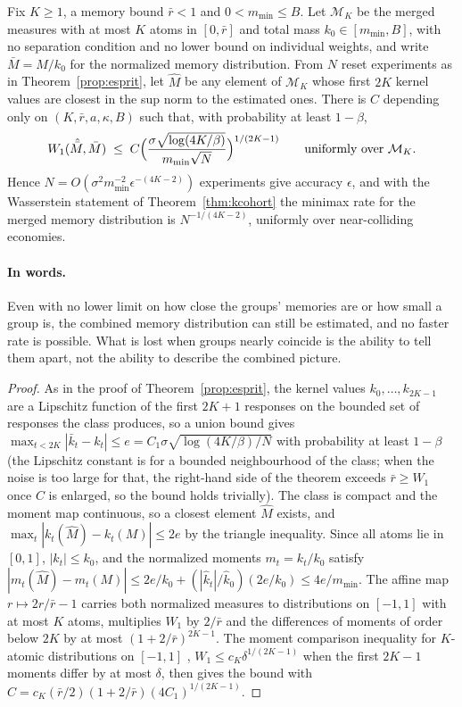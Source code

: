 \begin{theorem}\label{thm:uniformw1}
Fix $K\ge1$, a memory bound $\bar r<1$ and $0<m_{\min}\le B$. Let $\mathcal M_K$ be the merged measures with at most $K$ atoms in $[0,\bar r]$ and total mass $k_0\in[m_{\min},B]$, with no separation condition and no lower bound on individual weights, and write $\bar M=M/k_0$ for the normalized memory distribution. From $N$ reset experiments as in Theorem~\ref{prop:esprit}, let $\hat M$ be any element of $\mathcal M_K$ whose first $2K$ kernel values are closest in the sup norm to the estimated ones. There is $C$ depending only on $(K,\bar r,a,\kappa,B)$ such that, with probability at least $1-\beta$,
\[
W_1(\hat{\bar M},\bar M)\;\le\;C\Bigl(\frac{\sigma\sqrt{\log(4K/\beta)}}{m_{\min}\sqrt N}\Bigr)^{1/(2K-1)}\qquad\text{uniformly over }\mathcal M_K .
\]
Hence $N=O(\sigma^2m_{\min}^{-2}\epsilon^{-(4K-2)})$ experiments give accuracy $\epsilon$, and with the Wasserstein statement of Theorem~\ref{thm:kcohort} the minimax rate for the merged memory distribution is $N^{-1/(4K-2)}$, uniformly over near-colliding economies.
\end{theorem}

\paragraph{In words.} Even with no lower limit on how close the groups' memories are or how small a group is, the combined memory distribution can still be estimated, and no faster rate is possible. What is lost when groups nearly coincide is the ability to tell them apart, not the ability to describe the combined picture.

\begin{proof}
As in the proof of Theorem~\ref{prop:esprit}, the kernel values $k_0,\ldots,k_{2K-1}$ are a Lipschitz function of the first $2K+1$ responses on the bounded set of responses the class produces, so a union bound gives $\max_{t<2K}|\bar k_t-k_t|\le e=C_1\sigma\sqrt{\log(4K/\beta)/N}$ with probability at least $1-\beta$ (the Lipschitz constant is for a bounded neighbourhood of the class; when the noise is too large for that, the right-hand side of the theorem exceeds $\bar r\ge W_1$ once $C$ is enlarged, so the bound holds trivially). The class is compact and the moment map continuous, so a closest element $\hat M$ exists, and $\max_t|k_t(\hat M)-k_t(M)|\le2e$ by the triangle inequality. Since all atoms lie in $[0,1]$, $|k_t|\le k_0$, and the normalized moments $m_t=k_t/k_0$ satisfy $|m_t(\hat M)-m_t(M)|\le2e/k_0+(|\hat k_t|/\hat k_0)(2e/k_0)\le4e/m_{\min}$. The affine map $r\mapsto2r/\bar r-1$ carries both normalized measures to distributions on $[-1,1]$ with at most $K$ atoms, multiplies $W_1$ by $2/\bar r$ and the differences of moments of order below $2K$ by at most $(1+2/\bar r)^{2K-1}$. The moment comparison inequality for $K$-atomic distributions on $[-1,1]$ \citep{wu2020}, $W_1\le c_K\delta^{1/(2K-1)}$ when the first $2K-1$ moments differ by at most $\delta$, then gives the bound with $C=c_K(\bar r/2)(1+2/\bar r)(4C_1)^{1/(2K-1)}$.
\end{proof}

